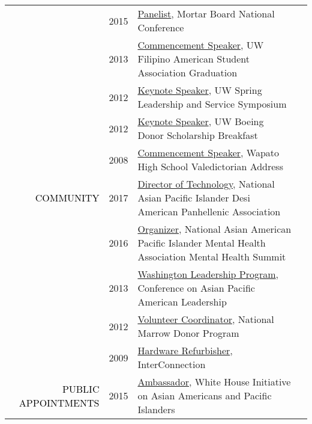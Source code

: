 \documentclass[12pt]{article}
\begin{document}
{{\begin{longtable}{Rp{1.0in}p{0.25in}p{4.75in}}
& \footnotesize{2015} & \href{http://www.mortarboard.org/conference/}{{Panelist}}, Mortar Board National Conference \\

& \footnotesize{2013} & \href{http://youtu.be/uz1tukrR-7E}{{Commencement Speaker}}, UW Filipino American Student Association Graduation \\

& \footnotesize{2012} & \href{https://youtu.be/WMPhe6H7yiM}{{Keynote Speaker}}, UW Spring Leadership and Service Symposium \\

& \footnotesize{2012} & \href{https://web.archive.org/web/20170801205151/https://ischool.uw.edu/news/2012/04/bryan-dosono-informatics-student-speaks-boeing-scholarship-breakfast}{{Keynote Speaker}}, UW Boeing Donor Scholarship Breakfast \\

& \footnotesize{2008} & \href{https://youtu.be/5gt7nFRgkac}{{Commencement Speaker}}, Wapato High School Valedictorian Address \\

\textcolor{black}{\footnotesize{\uppercase{Community}}} & \footnotesize{2017} & \href{http://napahq.org}{{Director of Technology}}, National Asian Pacific Islander Desi American Panhellenic Association \\

& \footnotesize{2016} & \href{https://www.facebook.com/events/215634702135825/}{{Organizer}}, National Asian American Pacific Islander Mental Health Association Mental Health Summit \\

& \footnotesize{2013} & \href{http://www.capal.org/programs/wlp/}{{Washington Leadership Program}}, Conference on Asian Pacific American Leadership \\

& \footnotesize{2012} & \href{http://www.dailyuw.com/news/article_de3524ce-3d5e-5dd2-8de7-5deebee463d9.html}{{Volunteer Coordinator}}, National Marrow Donor Program \\

& \footnotesize{2009} & \href{http://www.washington.edu/news/2010/04/22/student-service-and-leadership-to-be-celebrated-april-28/}{{Hardware Refurbisher}}, InterConnection \\

\textcolor{black}{\footnotesize{\uppercase{Public Appointments}}} & \footnotesize{2015} & \href{http://sites.ed.gov/aapi/e3-ambassadors/}{{Ambassador}}, White House Initiative on Asian Americans and Pacific Islanders \\


\end{longtable}}}
\end{document}
